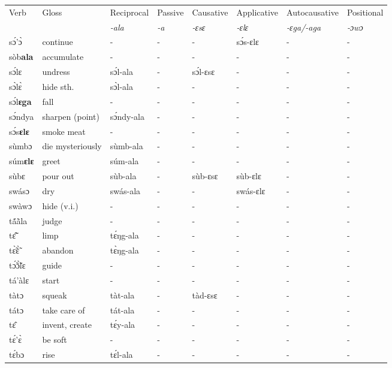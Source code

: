 \begin{sidewaystable}
\begin{tabular}{llllllll}
 \lsptoprule
 Verb & Gloss & Reciprocal & Passive  & Causative  & Applicative   & Autocausative & Positional   \\
  &    & {\itshape -ala} & {\itshape -a} & {\itshape -ɛsɛ} & {\itshape -ɛlɛ} & {\itshape -ɛga/-aga}  & {\itshape -ɔwɔ}  \\
\midrule
sɔ́'ɔ̀ & continue & - & - & - & sɔ́s-ɛlɛ & -  & - \\
sòb{\bfseries ala} & accumulate & - & - &  - & - & - & - \\
sɔ́lɛ & undress & sɔ́l-ala & - & sɔ́l-ɛsɛ & - & - & - \\
sɔ̀lɛ̀ & hide sth. & sɔ̀l-ala & - & - & - &  - & - \\
sɔ́l{\bfseries ɛga} & fall & - & - & - &  - & - & - \\
sɔ́ndya & sharpen (point) & sɔ́ndy-ala & - & - & - & - &  - \\
sɔ́s{\bfseries ɛlɛ} & smoke meat & - & - & - & - & - & - \\
sùmbɔ & die mysteriously & sùmb-ala & - & - & - & - & - \\
súm{\bfseries ɛlɛ} & greet & súm-ala & - & - & - & - &  - \\
sùbɛ & pour out & sùb-ala & - & sùb-ɛsɛ & sùb-ɛlɛ & - & - \\
swásɔ & dry & swás-ala & - & - & swás-ɛlɛ & - & - \\
swàwɔ & hide (v.i.) & - & - & - & - & - & - \\
tã́ã̀la & judge & - & - &  - & - &  - & - \\
tɛ̃̂ & limp & tɛ́ŋg-ala & - & - & - & - & - \\
tɛ̃̀ɛ̃̀ & abandon & tɛ̀ŋg-ala & - & - & - & - & - \\
tɔ̃́ɔ̃̀lɛ & guide & - & - & - & - & - & - \\
tá'àlɛ & start & -  & - & - & - & - & - \\
tàtɔ & squeak & tàt-ala & - & tàd-ɛsɛ & - &  - & - \\
tátɔ & take care of & tát-ala & - & - &  - & - & - \\
tɛ̂ & invent, create & tɛ́y-ala & - & - & - & - & - \\
tɛ́'ɛ̀ & be soft & - & - &  - & - & - & - \\
tɛ́bɔ & rise & tɛ́l-ala & - & - & - & - & - \\
\midrule\end{tabular}\end{sidewaystable}

